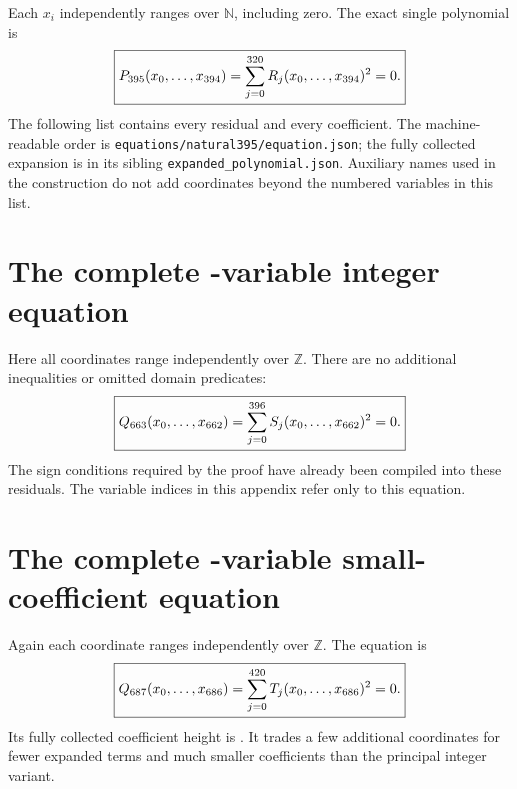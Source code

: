 \documentclass[10pt,letterpaper]{article}
\theoremstyle{remark}\newtheorem{remark}[theorem]{Remark}
\newcommand{\N}{\mathbb N}\newcommand{\Z}{\mathbb Z}
\newcommand{\file}[1]{\texttt{\nolinkurl{#1}}}
\newcommand{\PN}{P_{\nvars}}\newcommand{\PZ}{Q_{\zvars}}\newcommand{\PS}{Q_{\svars}}
\begin{document}
Each $x_i$ independently ranges over $\N$, including zero. The exact
single polynomial is
\[
 \boxed{\PN(x_0,\ldots,x_{\nvarlast})=
       \sum_{j=0}^{\nlast}R_j(x_0,\ldots,x_{\nvarlast})^2=0.}
\]
The following list contains every residual and every coefficient.
The machine-readable order is \file{equations/natural395/equation.json};
the fully collected expansion is in its sibling
\file{expanded_polynomial.json}. Auxiliary names used in the construction
do not add coordinates beyond the numbered variables in this list.


\clearpage
\section{The complete \zvars-variable integer equation}\label{app:integer}

Here all coordinates range independently over $\Z$. There are no
additional inequalities or omitted domain predicates:
\[
 \boxed{\PZ(x_0,\ldots,x_{\zvarlast})=
       \sum_{j=0}^{\zlast}S_j(x_0,\ldots,x_{\zvarlast})^2=0.}
\]
The sign conditions required by the proof have already been compiled
into these residuals. The variable indices in this appendix refer only
to this equation.


\clearpage
\section{The complete \svars-variable small-coefficient equation}\label{app:small}

Again each coordinate ranges independently over $\Z$. The equation is
\[
 \boxed{\PS(x_0,\ldots,x_{\svarlast})=
       \sum_{j=0}^{\slast}T_j(x_0,\ldots,x_{\svarlast})^2=0.}
\]
Its fully collected coefficient height is \sheight. It trades a few
additional coordinates for fewer expanded terms and much smaller
coefficients than the principal integer variant.

\end{document}
